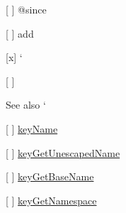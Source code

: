 \begin{DoxyItemize}
\item \mbox{[} \mbox{]} {\ttfamily @since}
\begin{DoxyItemize}
\item \mbox{[} \mbox{]} add
\end{DoxyItemize}
\item \mbox{[}x\mbox{]} `{\ttfamily }
\item {\ttfamily \mbox{[} \mbox{]}}\begin{DoxySeeAlso}{See also}
`
\begin{DoxyItemize}
\item \mbox{[} \mbox{]} \hyperlink{group__keyname_ga8e805c726a60da921d3736cda7813513}{key\+Name}
\item \mbox{[} \mbox{]} \hyperlink{group__keyname_ga44a576c7919d5b03f28d3ed3afaa7cd1}{key\+Get\+Unescaped\+Name}
\item \mbox{[} \mbox{]} \hyperlink{group__keyname_ga0992d26bcfca767cb8e77053a483eb64}{key\+Get\+Base\+Name}
\item \mbox{[} \mbox{]} \hyperlink{group__keyname_gafc3ca03ed10f87eb59bdc02cf2a0de8d}{key\+Get\+Namespace}
\end{DoxyItemize}
\end{DoxySeeAlso}

\end{DoxyItemize}


